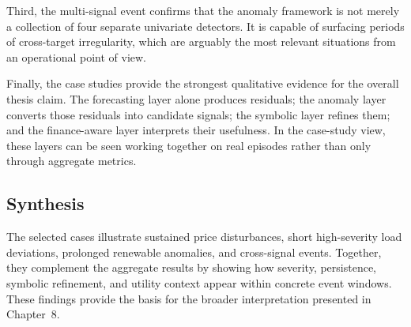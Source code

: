 Third, the multi-signal event confirms that the anomaly framework is not merely a collection of four separate univariate detectors. It is capable of surfacing periods of cross-target irregularity, which are arguably the most relevant situations from an operational point of view.

Finally, the case studies provide the strongest qualitative evidence for the overall thesis claim. The forecasting layer alone produces residuals; the anomaly layer converts those residuals into candidate signals; the symbolic layer refines them; and the finance-aware layer interprets their usefulness. In the case-study view, these layers can be seen working together on real episodes rather than only through aggregate metrics.

\subsection{Synthesis}

The selected cases illustrate sustained price disturbances, short high-severity
load deviations, prolonged renewable anomalies, and cross-signal events. Together,
they complement the aggregate results by showing how severity, persistence,
symbolic refinement, and utility context appear within concrete event windows.
These findings provide the basis for the broader interpretation presented in
Chapter~8.